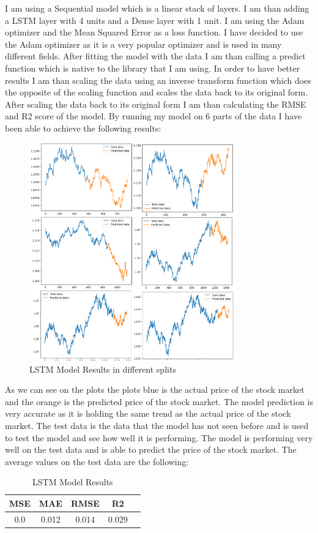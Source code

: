 \documentclass{imc-inf}
\begin{document}
	
	I am using a Sequential model which is a linear stack of layers. I am than adding a LSTM
	layer with 4 units and a Dense layer with 1 unit. I am using the Adam optimizer and the Mean Squared Error as a loss function.
	I have decided to use the Adam optimizer as it is a very popular optimizer and is used in many different fields. After fitting the model with the data I am than calling a predict function which is native to the library 
	that I am using. In order to have better results I am than scaling the data using an inverse transform function which does the opposite of the scaling function and scales the data back to its original form. 
	After scaling the data back to its original form I am than calculating the RMSE and R2 score of the model. 
	By running my model on 6 parts of the data I have been able to achieve the following results:			
	\begin{figure}
		\centering
		\includegraphics[width=0.8\textwidth]{lstm_chart.png}
		\caption{LSTM Model Results in different splits}
		\label{fig:lstm_model_plots}
	\end{figure}
	As we can see on the plots the plots blue is the actual price of the stock market and the orange is the predicted price of the stock market. The model prediction is very accurate as it is holding the same trend as the actual price
	of the stock market. The test data is the data that the model has not seen before and is used to test the model and see how well it is performing. The model is performing very well on the test data and is able to predict the price of the stock market.
	The average values on the test data are the following: 
	\begin{table}[h!]
		\centering
		\begin{tabular}{|c|c|c|c|c|}
			\hline
			\textbf{MSE} & \textbf{MAE} & \textbf{RMSE}  & \textbf{R2}\\ \hline
			0.0 & 0.012 & 0.014 & 0.029\\ \hline
			
			
		\end{tabular}
		\caption{LSTM Model Results}
		\label{tab:lstm_model_results}
		
	\end{table}
	
\end{document}
